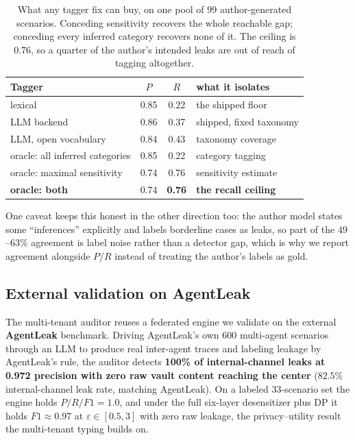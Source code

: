 \documentclass[sigconf,anonymous,review]{acmart}
\theoremstyle{acmplain}
\begin{document}
\begin{table}[t]\centering\small
\begin{tabular}{lccl}
\toprule
Tagger & $P$ & $R$ & what it isolates \\
\midrule
lexical & 0.85 & 0.22 & the shipped floor \\
LLM backend & 0.86 & 0.37 & shipped, fixed taxonomy \\
LLM, open vocabulary & 0.84 & 0.43 & taxonomy coverage \\
oracle: all inferred categories & 0.85 & 0.22 & category tagging \\
oracle: maximal sensitivity & 0.74 & 0.76 & sensitivity estimate \\
\textbf{oracle: both} & 0.74 & \textbf{0.76} & \textbf{the recall ceiling} \\
\bottomrule
\end{tabular}
\caption{What any tagger fix can buy, on one pool of $99$ author-generated
scenarios. Conceding sensitivity recovers the whole reachable gap; conceding every
inferred category recovers none of it. The ceiling is $0.76$, so a quarter of the
author's intended leaks are out of reach of tagging altogether.}
\label{tab:ceiling}
\end{table}

One caveat keeps this honest in the other direction too: the author model states
some ``inferences'' explicitly and labels borderline cases as leaks, so part of the
$49$--$63\%$ agreement is label noise rather than a detector gap, which is why we
report agreement alongside $P/R$ instead of treating the author's labels as gold.

\subsection{External validation on AgentLeak}
The multi-tenant
auditor reuses a federated engine we validate on the external \textbf{AgentLeak}
benchmark. Driving AgentLeak's own 600 multi-agent scenarios through an LLM to
produce real inter-agent traces and labeling leakage by AgentLeak's rule, the
auditor detects \textbf{100\% of internal-channel leaks at 0.972 precision with
zero raw vault content reaching the center} ($82.5\%$ internal-channel leak rate,
matching AgentLeak). On a labeled 33-scenario set the engine holds $P/R/F1=1.0$,
and under the full six-layer desensitizer plus DP it holds $F1\approx0.97$ at
$\varepsilon\in[0.5,3]$ with zero raw leakage, the privacy--utility result the
multi-tenant typing builds on.
\end{document}

